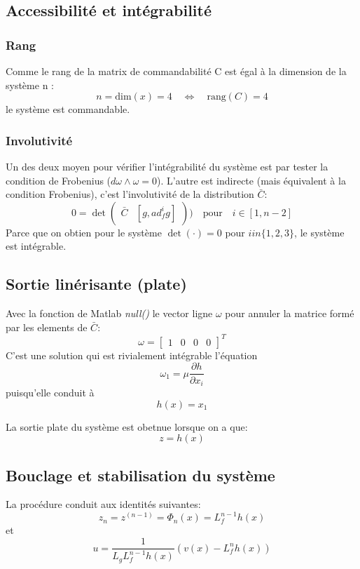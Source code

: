 \documentclass[a4paper,11pt]{article}
\begin{document}
\subsection{Accessibilit\'e et int\'egrabilit\'e}
\subsubsection{Rang}
Comme le rang de la matrix de commandabilit\'e C est \'egal \`a la dimension de la syst\`eme n :
\[ n = \text{dim}(x) = 4 \quad \Leftrightarrow \quad \text{rang}(C) = 4 \]
le syst\`eme est commandable. 

\subsubsection{Involutivit\'e}
Un des deux moyen pour v\'erifier l'int\'egrabilit\'e du syst\`eme est par tester la condition de Frobenius ($d\omega \wedge \omega = 0$). L'autre est indirecte (mais \'equivalent \`a la condition Frobenius), c'est l'involutivit\'e de la distribution $\bar C$:
\begin{equation}
0 = \det \begin{pmatrix} \bar C & \left[g, a d_f^{i}g \right]\end{pmatrix}) \quad \text{pour} \quad i \in \left[1, n-2 \right]
\end{equation}
Parce que on obtien pour le syst\`eme $\det(\cdot) = 0$ pour $i in \lbrace 1,2,3 \rbrace$, le syst\`eme est int\'egrable.

\subsection{Sortie lin\'erisante (plate)}
Avec la fonction de Matlab \textit{null()} le vector ligne $\omega$ pour annuler la matrice form\'e par les elements de $\bar C$:
\[
    \omega = \begin{bmatrix}1 & 0 & 0 & 0 \end{bmatrix}^T
\]
C'est une solution qui est rivialement int\'egrable l'\'equation
\begin{equation}
  \omega_1 = \mu \frac{\partial h}{\partial x_i}
\end{equation}
puisqu'elle conduit \`a
\[
h(x) = x_1
\]

La sortie plate du syst\`eme est obetnue lorsque on a que:
\begin{equation}
z = h(x)
\end{equation}


\subsection{Bouclage et stabilisation du syst\`eme}
La proc\'edure conduit aux identit\'es suivantes:
\begin{equation}
  z_n = z^{(n-1)} = \Phi_{n}(x) = L_f^{n-1}h(x)
\end{equation}
et
\begin{equation}
  u =\frac{1}{L_g L_f^{n-1} h(x)} \left(v(x) - L_f^n h(x) \right)
\end{equation}
\end{document}
